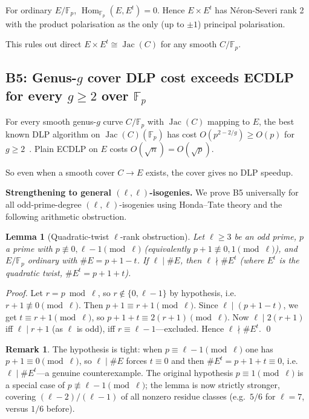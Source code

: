 \documentclass[11pt,a4paper]{article}
\newtheorem{lemma}[theorem]{Lemma}
\theoremstyle{definition}
\newtheorem{remark}[theorem]{Remark}
\newcommand{\FF}{\mathbb{F}}
\newcommand{\Hom}{\operatorname{Hom}}
\newcommand{\Jac}{\operatorname{Jac}}
\begin{document}
For ordinary $E/\FF_p$, $\Hom_{\FF_p}(E, E^t) = 0$. Hence
$E \times E^t$ has Néron-Severi rank 2 with the product
polarisation as the only (up to $\pm 1$) principal polarisation.

This rules out direct $E \times E^t \cong \Jac(C)$ for any smooth
$C/\FF_p$.

\subsection*{B5: Genus-$g$ cover DLP cost exceeds ECDLP for every
$g \geq 2$ over $\FF_p$}

For every smooth genus-$g$ curve $C/\FF_p$ with $\Jac(C)$ mapping
to $E$, the best known DLP algorithm on $\Jac(C)(\FF_p)$ has cost
$O(p^{2 - 2/g}) \geq O(p)$ for $g \geq 2$~\cite{gaudry2000}. Plain
ECDLP on $E$ costs $O(\sqrt{n}) = O(\sqrt{p})$.

So even when a smooth cover $C \to E$ exists, the cover gives no
DLP speedup.

\medskip\noindent\textbf{Strengthening to general $(\ell,\ell)$-isogenies.}
We prove B5 universally for all odd-prime-degree $(\ell,\ell)$-isogenies
using Honda--Tate theory and the following arithmetic obstruction.

\begin{lemma}[Quadratic-twist $\ell$-rank obstruction]\label{lem:ell-rank}
Let $\ell \geq 3$ be an odd prime, $p$ a prime with
$p \not\equiv 0, \ell{-}1 \pmod{\ell}$ (equivalently $p+1 \not\equiv 0,1 \pmod{\ell}$),
and $E/\FF_p$ ordinary with $\#E = p+1-t$.  If $\ell \mid \#E$, then
$\ell \nmid \#E^t$ (where $E^t$ is the quadratic twist,
$\#E^t = p+1+t$).
\end{lemma}

\begin{proof}
Let $r = p \bmod \ell$, so $r \notin \{0, \ell{-}1\}$ by hypothesis,
i.e.\ $r+1 \not\equiv 0 \pmod{\ell}$.
Then $p+1 \equiv r+1 \pmod{\ell}$.  Since $\ell \mid (p+1-t)$,
we get $t \equiv r+1 \pmod{\ell}$, so
$p+1+t \equiv 2(r+1) \pmod{\ell}$.
Now $\ell \mid 2(r+1)$ iff $\ell \mid r+1$ (as $\ell$ is odd),
iff $r \equiv \ell{-}1$---excluded.  Hence $\ell \nmid \#E^t$. \qed
\end{proof}

\begin{remark}
The hypothesis is tight: when $p \equiv \ell{-}1 \pmod{\ell}$ one has
$p+1 \equiv 0 \pmod\ell$, so $\ell \mid \#E$ forces $t \equiv 0$
and then $\#E^t = p+1+t \equiv 0$, i.e.\ $\ell \mid \#E^t$---a
genuine counterexample.  The original hypothesis $p \equiv 1 \pmod\ell$
is a special case of $p \not\equiv \ell{-}1 \pmod\ell$; the lemma
is now strictly stronger, covering
$(\ell{-}2)/(\ell{-}1)$ of all nonzero residue classes
(e.g.\ $5/6$ for $\ell=7$, versus $1/6$ before).
\end{remark}
\end{document}
